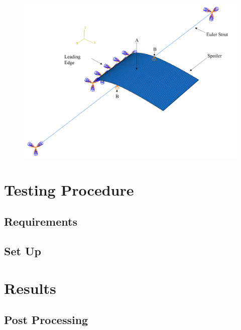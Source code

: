 \documentclass{IEEEtran}
\begin{document}
    \begin{figure}[!h]
        \centering
        \includegraphics[width=\textwidth]{ModellingImages/ModelAssem.png}
        \caption{}
        \label{fig:ModelAssem}
    \end{figure}
	
    \section{Testing Procedure}

    \subsection{Requirements}

    \subsection{Set Up}
	
	\section{Results}

    \subsection{Post Processing}

\end{document}
